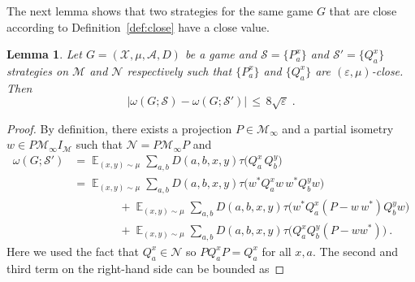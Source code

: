 \documentclass[11pt]{article}
\newtheorem{lemma}[theorem]{Lemma}
\theoremstyle{definition}
\newcommand{\strategy}{\mathscr{S}}
\newcommand{\ket}[1]{|#1\rangle}
\newcommand{\bra}[1]{\langle#1|}
\DeclareMathOperator*{\Expectation}{\mathbb{E}}
\newcommand{\Es}[1]{\Expectation_{#1}}
\newcommand{\mA}{\ensuremath{\mathcal{A}}}
\newcommand{\mM}{\ensuremath{\mathcal{M}}}
\newcommand{\mX}{\ensuremath{\mathcal{X}}}
\newcommand{\eps}{\varepsilon}
\newcommand{\mN}{\mathcal{N}}
\begin{document}
The next lemma shows that two strategies for the same game $G$ that are close according to Definition~\ref{def:close} have a close value. 

\begin{lemma}\label{lem:close-value}
Let $G=(\mX,\mu,\mA,D)$ be a game and $\strategy=\{P^x_a\}$ and $\strategy'=\{Q^x_a\}$ strategies on $\mM$ and $\mN$ respectively such that $\{P^x_a\}$ and $\{Q^x_a\}$ are $(\eps,\mu)$-close. Then 
\[ \big|\omega(G;\strategy) - \omega(G;\strategy')\big|\,\leq\, 8\sqrt{\eps} \;.\]
\end{lemma}

\begin{proof}
By definition, there exists a projection $P \in \mM_\infty$ and a partial isometry $w \in P \mM_\infty I_\mM$ such that $\mN = P \mM_\infty P$ and
\begin{align*}
\omega(G;\strategy') &= \Es{(x,y)\sim\mu} \sum_{a,b} D(a,b,x,y)  \tau\big( Q^x_a \, Q^y_b \big)\\
&=  \Es{(x,y)\sim\mu} \sum_{a,b} D(a,b,x,y)  \tau\big( w^* Q^x_a w\, w^* Q^y_b w\big)\\
&\qquad\qquad+  \Es{(x,y)\sim\mu} \sum_{a,b} D(a,b,x,y)  \tau\big( w^* Q^x_a (P - w\, w^* ) Q^y_b w\big) \\
&\qquad\qquad+ \Es{(x,y)\sim\mu} \sum_{a,b} D(a,b,x,y)  \tau\big(Q^x_a  Q^y_b (P-ww^*)\big)~.
\end{align*}
Here we used the fact that $Q^x_a \in \mN$ so $P Q^x_a P = Q^x_a$ for all $x,a$. 
The second and third term on the right-hand side can be bounded as

\end{proof}
\end{document}
